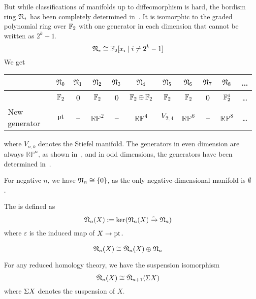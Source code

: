 \documentclass[a4paper,11pt]{article}
\begin{document}
But while classifications of manifolds up to diffeomorphism is hard, the bordism ring \(\mathfrak{N}_\ast\) has been completely determined in\ \cite{thom}. It is isomorphic to the graded polynomial ring over \(\mathbb{F}_2\) with one generator in each dimension that cannot be written as \(2^k+1\).
\[\mathfrak{N}_\ast\cong\mathbb{F}_2[x_i\mid i\neq 2^k-1]\]
We get \begin{center}
\begin{tabular}[c]{l|c|c|c|c|c|c|c|c|c|c}
    & $\mathfrak{N}_0$ & $\mathfrak{N}_1$ & $\mathfrak{N}_2$ & $\mathfrak{N}_3$ & $\mathfrak{N}_4$ & $\mathfrak{N}_5$ & $\mathfrak{N}_6$ & $\mathfrak{N}_7$ & $\mathfrak{N}_8$ & \dots\\ \hline
    & $\mathbb{F}_2$ & 0 & $\mathbb{F}_2$ & 0 & $\mathbb{F}_2\oplus\mathbb{F}_2$ & $\mathbb{F}_2$ & $\mathbb{F}_2$ & 0 & $\mathbb{F}_2^4$ & \dots\\ \hline
    New generator & $\mathrm{pt}$ & -- & $\mathbb{RP}^2$ & -- & $\mathbb{RP}^4$ & $V_{2,4}$ & $\mathbb{RP}^6$ & -- & $\mathbb{RP}^8$ & \dots
\end{tabular}
\end{center}
where \(V_{n,k}\) denotes the Stiefel manifold. The generators in even dimension are always \(\mathbb{RP}^n\), as shown in\ \cite{thom}, and in odd dimensions, the generators have been determined in\ \cite{dold}.

For negative \(n\), we have \(\mathfrak{N}_n\cong\{0\}\), as the only negative-dimensional manifold is \(\emptyset\).



\begin{definition}
    The  is defined as
    \[\tilde{\mathfrak{N}}_n(X):=\ker(\mathfrak{N}_n(X)\xrightarrow{\varepsilon}\mathfrak{N}_n)\]
    where \(\varepsilon\) is the induced map of \(X\to\mathrm{pt}\).
\end{definition}

\begin{remark}
    \[\mathfrak{N}_n(X)\cong\tilde{\mathfrak{N}}_n(X)\oplus\mathfrak{N}_n\]
\end{remark}

\begin{remark}
    For any reduced homology theory, we have the suspension isomorphism \[\tilde{\mathfrak{N}}_n(X)\cong\tilde{\mathfrak{N}}_{n+1}(\Sigma X)\]
    where \(\Sigma X\) denotes the suspension of \(X\).
\end{remark}
\end{document}

